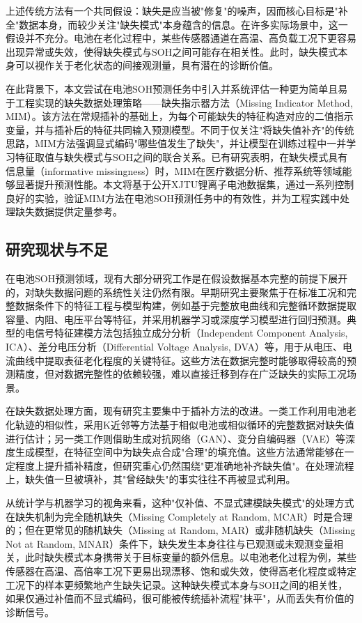 \documentclass[10pt,a4paper]{ctexart}
\begin{document}
上述传统方法有一个共同假设：缺失是应当被"修复"的噪声，因而核心目标是"补全"数据本身，而较少关注"缺失模式"本身蕴含的信息。在许多实际场景中，这一假设并不充分。电池在老化过程中，某些传感器通道在高温、高负载工况下更容易出现异常或失效，使得缺失模式与SOH之间可能存在相关性。此时，缺失模式本身可以视作关于老化状态的间接观测量，具有潜在的诊断价值。

在此背景下，本文尝试在电池SOH预测任务中引入并系统评估一种更为简单且易于工程实现的缺失数据处理策略——缺失指示器方法（Missing Indicator Method, MIM）\cite{jones1996indicator,van2023missing}。该方法在常规插补的基础上，为每个可能缺失的特征构造对应的二值指示变量，并与插补后的特征共同输入预测模型。不同于仅关注"将缺失值补齐"的传统思路，MIM方法强调显式编码"哪些值发生了缺失"，并让模型在训练过程中一并学习特征取值与缺失模式与SOH之间的联合关系。已有研究表明，在缺失模式具有信息量（informative missingness）时，MIM在医疗数据分析、推荐系统等领域能够显著提升预测性能\cite{sisk2023imputation,ehrig2025imputation}。本文将基于公开XJTU锂离子电池数据集，通过一系列控制良好的实验，验证MIM方法在电池SOH预测任务中的有效性，并为工程实践中处理缺失数据提供定量参考。

\subsection{研究现状与不足}

在电池SOH预测领域，现有大部分研究工作是在假设数据基本完整的前提下展开的，对缺失数据问题的系统性关注仍然有限\cite{shao2025soh}。早期研究主要聚焦于在标准工况和完整数据条件下的特征工程与模型构建，例如基于完整放电曲线和完整循环数据提取容量、内阻、电压平台等特征，并采用机器学习或深度学习模型进行回归预测。典型的电信号特征建模方法包括独立成分分析（Independent Component Analysis, ICA）、差分电压分析（Differential Voltage Analysis, DVA）等，用于从电压、电流曲线中提取表征老化程度的关键特征\cite{deng2025novel}。这些方法在数据完整时能够取得较高的预测精度，但对数据完整性的依赖较强，难以直接迁移到存在广泛缺失的实际工况场景。

在缺失数据处理方面，现有研究主要集中于插补方法的改进。一类工作利用电池老化轨迹的相似性，采用K近邻等方法基于相似电池或相似循环的完整数据对缺失值进行估计；另一类工作则借助生成对抗网络（GAN）、变分自编码器（VAE）等深度生成模型，在特征空间中为缺失点合成"合理"的填充值。这些方法通常能够在一定程度上提升插补精度，但研究重心仍然围绕"更准确地补齐缺失值"。在处理流程上，缺失值一旦被填补，其"曾经缺失"的事实往往不再被显式利用。

从统计学与机器学习的视角来看，这种"仅补值、不显式建模缺失模式"的处理方式在缺失机制为完全随机缺失（Missing Completely at Random, MCAR）时是合理的；但在更常见的随机缺失（Missing at Random, MAR）或非随机缺失（Missing Not at Random, MNAR）条件下，缺失发生本身往往与已观测或未观测变量相关，此时缺失模式本身携带关于目标变量的额外信息。以电池老化过程为例，某些传感器在高温、高倍率工况下更易出现漂移、饱和或失效，使得高老化程度或特定工况下的样本更频繁地产生缺失记录。这种缺失模式本身与SOH之间的相关性，如果仅通过补值而不显式编码，很可能被传统插补流程"抹平"，从而丢失有价值的诊断信号。
\end{document}
